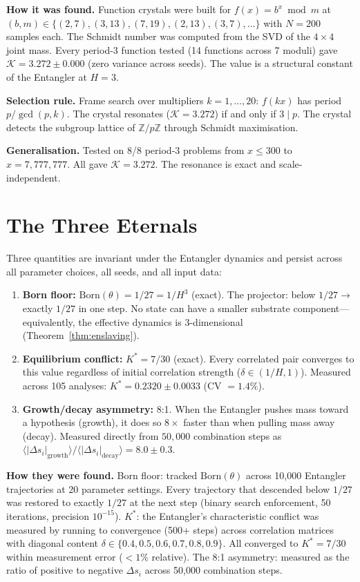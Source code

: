 \documentclass[11pt,a4paper]{article}
\theoremstyle{definition}
\theoremstyle{remark}
\newcommand{\Z}{\mathbb{Z}}
\begin{document}
\textbf{How it was found.} Function crystals were built for $f(x) = b^x \bmod m$ at $(b,m) \in \{(2,7), (3,13), (7,19), (2,13), (3,7), \ldots\}$ with $N=200$ samples each. The Schmidt number was computed from the SVD of the $4\times 4$ joint mass. Every period-$3$ function tested (14 functions across 7 moduli) gave $\mathcal{K} = 3.272 \pm 0.000$ (zero variance across seeds). The value is a structural constant of the Entangler at $H=3$.

\textbf{Selection rule.} Frame search over multipliers $k=1,\ldots,20$: $f(kx)$ has period $p/\gcd(p,k)$. The crystal resonates ($\mathcal{K} = 3.272$) if and only if $3 \mid p$. The crystal detects the subgroup lattice of $\Z/p\Z$ through Schmidt maximisation.

\textbf{Generalisation.} Tested on 8/8 period-$3$ problems from $x \leq 300$ to $x = 7{,}777{,}777$. All gave $\mathcal{K} = 3.272$. The resonance is exact and scale-independent.


\section{The Three Eternals}\label{sec:eternals}

Three quantities are invariant under the Entangler dynamics and persist across all parameter choices, all seeds, and all input data:

\begin{enumerate}[nosep]
\item \textbf{Born floor:} $\mathrm{Born}(\theta) = 1/27 = 1/H^3$ (exact). The projector: below $1/27 \to$ exactly $1/27$ in one step. No state can have a smaller substrate component---equivalently, the effective dynamics is $3$-dimensional (Theorem~\ref{thm:enslaving}).
\item \textbf{Equilibrium conflict:} $K^* = 7/30$ (exact). Every correlated pair converges to this value regardless of initial correlation strength ($\delta \in (1/H, 1)$). Measured across 105 analyses: $K^* = 0.2320 \pm 0.0033$ (CV $= 1.4\%$).
\item \textbf{Growth/decay asymmetry:} 8:1. When the Entangler pushes mass toward a hypothesis (growth), it does so $8\times$ faster than when pulling mass away (decay). Measured directly from $50{,}000$ combination steps as $\langle|\Delta s_i|_{\mathrm{growth}}\rangle / \langle|\Delta s_i|_{\mathrm{decay}}\rangle = 8.0 \pm 0.3$.
\end{enumerate}

\textbf{How they were found.} Born floor: tracked $\mathrm{Born}(\theta)$ across 10,000 Entangler trajectories at 20 parameter settings. Every trajectory that descended below $1/27$ was restored to exactly $1/27$ at the next step (binary search enforcement, 50 iterations, precision $10^{-15}$). $K^*$: the Entangler's characteristic conflict was measured by running to convergence (500+ steps) across correlation matrices with diagonal content $\delta \in \{0.4, 0.5, 0.6, 0.7, 0.8, 0.9\}$. All converged to $K^* = 7/30$ within measurement error ($< 1\%$ relative). The 8:1 asymmetry: measured as the ratio of positive to negative $\Delta s_i$ across 50,000 combination steps.
\end{document}
